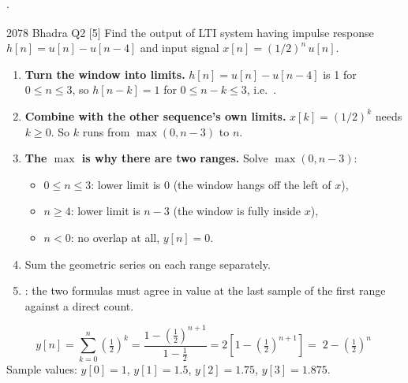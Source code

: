 \hr

{\color{sub}\footnotesize {} 
\gap$\cdot$\gap {}}

\begin{asked}{2078 Bhadra \textperiodcentered{} Q2 \textperiodcentered{} [5]}
Find the output of LTI system having impulse response $h[n]=u[n]-u[n-4]$ and input signal
$x[n]=(1/2)^n\,u[n]$.
\end{asked}

\begin{enumerate}
  \item \textbf{Turn the window into limits.} $h[n]=u[n]-u[n-4]$ is 1 for $0\le n\le3$,
        so $h[n-k]=1$ for $0\le n-k\le3$, i.e.\ .
  \item \textbf{Combine with the other sequence's own limits.} $x[k]=(1/2)^k$ needs
        $k\ge0$. So $k$ runs from $\max(0,n-3)$ to $n$.
  \item \textbf{The $\max$ is why there are two ranges.} Solve $\max(0,n-3)$:
  \begin{itemize}
    \item $0\le n\le3$: lower limit is $0$ (the window hangs off the left of $x$),
    \item $n\ge4$: lower limit is $n-3$ (the window is fully inside $x$),
    \item $n<0$: no overlap at all, $y[n]=0$.
  \end{itemize}
  \item Sum the geometric series on each range separately.
  \item {}: the two formulas must agree in value at the last sample of the first
        range against a direct count.
\end{enumerate}

\[ y[n]=\sum_{k=0}^{n}\left(\tfrac12\right)^k
       =\frac{1-\left(\frac12\right)^{n+1}}{1-\frac12}
       =2\left[1-\left(\tfrac12\right)^{n+1}\right]
       =\boxed{\;2-\left(\tfrac12\right)^{n}\;} \]
{\color{sub}\footnotesize Sample values: $y[0]=1$, $y[1]=1.5$, $y[2]=1.75$, $y[3]=1.875$.}

